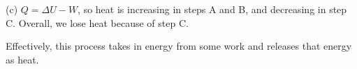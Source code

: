 \documentclass{article}
\begin{document}
(c) $Q=\Delta U-W$, so heat is increasing in steps A and B, and decreasing in step C. Overall, we lose heat because of step C.



Effectively, this process takes in energy from some work and releases that energy as heat.












\end{document}
